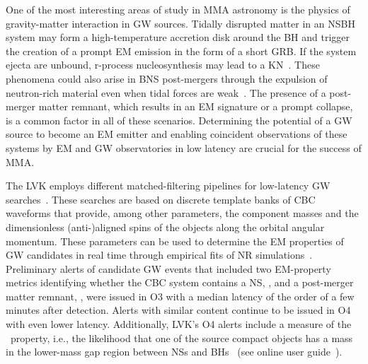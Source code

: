 One of the most interesting areas of study in \ac{MMA} astronomy is the physics of gravity-matter interaction in \ac{GW} sources. Tidally disrupted matter in an \ac{NSBH} system may form a
high-temperature accretion disk around the \ac{BH} and trigger the creation of a prompt \ac{EM} emission in the form of a short \ac{GRB}. If the system ejecta are unbound, r-process
nucleosynthesis may lead to a \ac{KN}~\cite{Lattimer:1974slx, Li:1998bw, Korobkin:2012uy, Barnes:2013wka, Tanaka:2013ana, Kasen:2014toa}. These phenomena could also arise in \ac{BNS}
post-mergers through the expulsion of neutron-rich material even when tidal forces are weak~\cite{LIGOScientific:2017ync, Arcavi:2017xiz, Coulter:2017wya, Kasliwal:2017ngb, Lipunov:2017dwd,
DES:2017kbs, Tanvir:2017pws}. The presence of a post-merger matter remnant, which results in an \ac{EM} signature or a prompt collapse, is a common factor in all of these scenarios. Determining
the potential of a \ac{GW} source to become an \ac{EM} emitter and enabling coincident observations of these systems by \ac{EM} and \ac{GW} observatories in low latency are crucial for the success
of \ac{MMA}.

The \ac{LVK} employs different matched-filtering pipelines for low-latency \ac{GW} searches~\cite{Sachdev:2020lfd,Nitz:2018rgo,Adams:2015ulm,Chu:2020pjv,Klimenko:2015ypf}. These searches are
based on discrete template banks of \ac{CBC} waveforms that provide, among other parameters, the component masses and the dimensionless (anti-)aligned spins of the objects along the orbital
angular momentum. These parameters can be used to determine the \ac{EM} properties of \ac{GW} candidates in real time through empirical fits of \ac{NR}
simulations~\cite{Foucart:2012nc,Foucart:2018rjc}. Preliminary alerts of candidate \ac{GW} events that included two \ac{EM}-property metrics identifying whether the \ac{CBC} system
contains a \ac{NS}, \hasns, and a post-merger matter remnant, \hasrem, were issued in \ac{O3} with a median latency of the order of a few minutes after detection. Alerts with similar content continue to be issued in \ac{O4} with even lower latency.  Additionally, \ac{LVK}'s \ac{O4} alerts include a measure of the \hasgap\ property, i.e., the likelihood that one of the
source compact objects has a mass in the lower-mass gap region between \ac{NS}s and \ac{BH}s~\cite{Farah:2021qom} (see online user guide~\cite{UserGuide}). 


